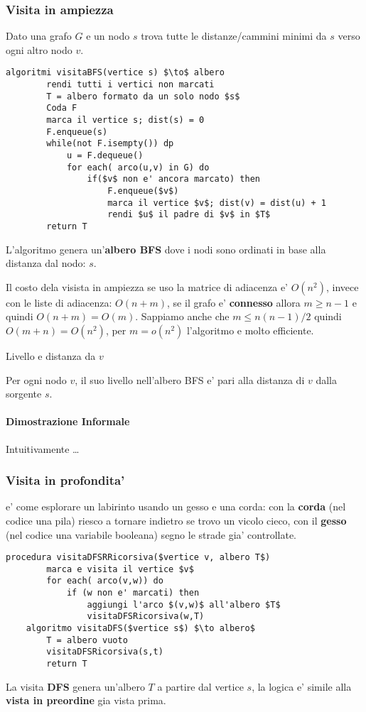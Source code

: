 \subsubsection{Visita in ampiezza}
Dato una grafo $G$ e un nodo $s$ trova tutte le distanze/cammini minimi da 
$s$ verso ogni altro nodo $v$.

\begin{lstlisting}[mathescape=true]
    algoritmi visitaBFS(vertice s) $\to$ albero
        rendi tutti i vertici non marcati
        T = albero formato da un solo nodo $s$
        Coda F
        marca il vertice s; dist(s) = 0
        F.enqueue(s)
        while(not F.isempty()) dp
            u = F.dequeue()
            for each( arco(u,v) in G) do
                if($v$ non e' ancora marcato) then
                    F.enqueue($v$)
                    marca il vertice $v$; dist(v) = dist(u) + 1
                    rendi $u$ il padre di $v$ in $T$
        return T
\end{lstlisting}

L'algoritmo genera un'\textbf{albero BFS} dove i nodi sono ordinati 
in base alla distanza dal nodo: $s$.

Il costo dela visista in ampiezza se uso la matrice di adiacenza e' $O(n^2)$,
invece con le liste di adiacenza:  $O(n+m)$, se il grafo e' \textbf{connesso} allora $m\geq n-1$ e quindi
$O(n+m)=O(m)$. Sappiamo anche che $m\leq n(n-1)/2$ quindi $O(m+n)=O(n^2)$, per $m=o(n^2)$ l'algoritmo e molto efficiente.

\begin{definition}{Livello e distanza da $v$}

    Per ogni nodo $v$, il suo livello nell'albero BFS e' pari
    alla distanza di $v$ dalla sorgente $s$.
\end{definition}

\paragraph{Dimostrazione Informale} 
    Intuitivamente \dots

\subsubsection{Visita in profondita'}
e' come esplorare un labirinto usando un gesso e una corda:
con la \textbf{corda} (nel codice una pila) riesco a tornare indietro se trovo un vicolo cieco,
con il \textbf{gesso} (nel codice una variabile booleana) segno le strade gia' controllate.

\begin{lstlisting}[mathescape=true]
    procedura visitaDFSRRicorsiva($vertice v, albero T$)
        marca e visita il vertice $v$
        for each( arco(v,w)) do
            if (w non e' marcati) then  
                aggiungi l'arco $(v,w)$ all'albero $T$
                visitaDFSRicorsiva(w,T)
    algoritmo visitaDFS($vertice s$) $\to albero$
        T = albero vuoto
        visitaDFSRicorsiva(s,t)
        return T
\end{lstlisting}

La visita \textbf{DFS} genera un'albero $T$ a partire dal vertice $s$,
la logica e' simile alla \textbf{vista in preordine} gia vista prima.